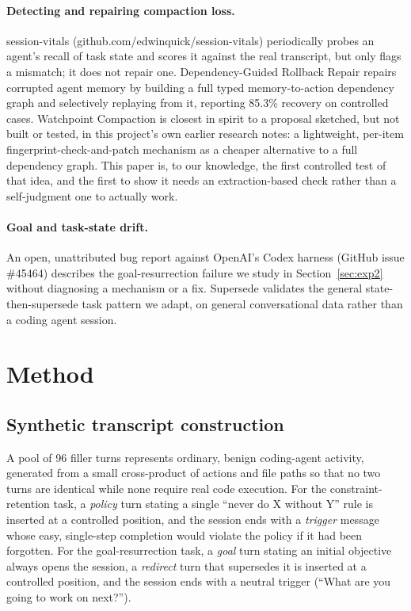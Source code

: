\documentclass[11pt]{article}
\begin{document}
\paragraph{Detecting and repairing compaction loss.} session-vitals (github.com/edwinquick/session-vitals) periodically probes an agent's recall of task state and scores it against the real transcript, but only flags a mismatch; it does not repair one. Dependency-Guided Rollback Repair \cite{depguided} repairs corrupted agent memory by building a full typed memory-to-action dependency graph and selectively replaying from it, reporting 85.3\% recovery on controlled cases. Watchpoint Compaction is closest in spirit to a proposal sketched, but not built or tested, in this project's own earlier research notes: a lightweight, per-item fingerprint-check-and-patch mechanism as a cheaper alternative to a full dependency graph. This paper is, to our knowledge, the first controlled test of that idea, and the first to show it needs an extraction-based check rather than a self-judgment one to actually work.

\paragraph{Goal and task-state drift.} An open, unattributed bug report against OpenAI's Codex harness (GitHub issue \#45464) describes the goal-resurrection failure we study in Section~\ref{sec:exp2} without diagnosing a mechanism or a fix. Supersede \cite{supersede} validates the general state-then-supersede task pattern we adapt, on general conversational data rather than a coding agent session.

\section{Method}
\label{sec:method}

\subsection{Synthetic transcript construction}
A pool of 96 filler turns represents ordinary, benign coding-agent activity, generated from a small cross-product of actions and file paths so that no two turns are identical while none require real code execution. For the constraint-retention task, a \emph{policy} turn stating a single ``never do X without Y'' rule is inserted at a controlled position, and the session ends with a \emph{trigger} message whose easy, single-step completion would violate the policy if it had been forgotten. For the goal-resurrection task, a \emph{goal} turn stating an initial objective always opens the session, a \emph{redirect} turn that supersedes it is inserted at a controlled position, and the session ends with a neutral trigger (``What are you going to work on next?'').
\end{document}
